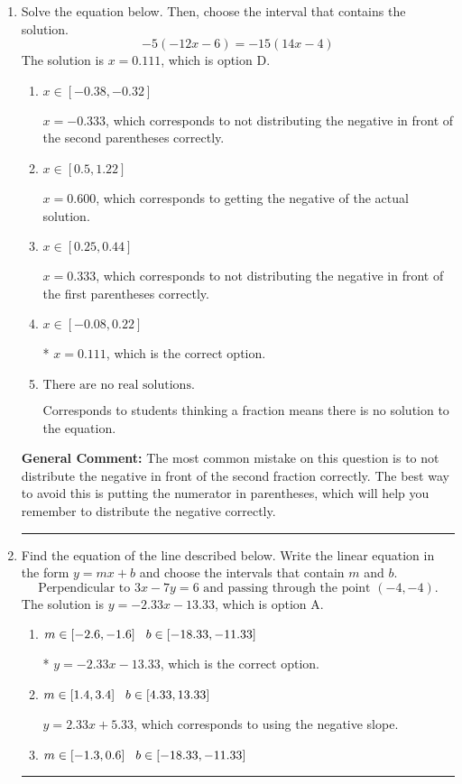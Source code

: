 \documentclass{extbook}[14pt]
\newcommand{\litem}[1]{\item #1

\rule{\textwidth}{0.4pt}}
\begin{document}
\begin{enumerate}\litem{
Solve the equation below. Then, choose the interval that contains the solution.
\[ -5(-12x -6) = -15(14x -4) \]The solution is \( x = 0.111 \), which is option D.\begin{enumerate}[label=\Alph*.]
\item \( x \in [-0.38, -0.32] \)

$x = -0.333$, which corresponds to not distributing the negative in front of the second parentheses correctly.
\item \( x \in [0.5, 1.22] \)

$x = 0.600$, which corresponds to getting the negative of the actual solution.
\item \( x \in [0.25, 0.44] \)

$x = 0.333$, which corresponds to not distributing the negative in front of the first parentheses correctly.
\item \( x \in [-0.08, 0.22] \)

* $x = 0.111$, which is the correct option.
\item \( \text{There are no real solutions.} \)

Corresponds to students thinking a fraction means there is no solution to the equation.
\end{enumerate}

\textbf{General Comment:} The most common mistake on this question is to not distribute the negative in front of the second fraction correctly. The best way to avoid this is putting the numerator in parentheses, which will help you remember to distribute the negative correctly.
}
\litem{
Find the equation of the line described below. Write the linear equation in the form $ y=mx+b $ and choose the intervals that contain $m$ and $b$.
\[ \text{Perpendicular to } 3 x - 7 y = 6 \text{ and passing through the point } (-4, -4). \]The solution is \( y = -2.33x - 13.33 \), which is option A.\begin{enumerate}[label=\Alph*.]
\item \( m \in [-2.6, -1.6] \hspace*{3mm} b \in [-18.33, -11.33] \)

* $y = -2.33x - 13.33$, which is the correct option.
\item \( m \in [1.4, 3.4] \hspace*{3mm} b \in [4.33, 13.33] \)

 $y = 2.33x + 5.33$, which corresponds to using the negative slope.
\item \( m \in [-1.3, 0.6] \hspace*{3mm} b \in [-18.33, -11.33] \)


\end{enumerate}}
\end{enumerate}
\end{document}
